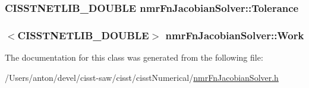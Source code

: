 \subsubsection[{Tolerance}]{\setlength{\rightskip}{0pt plus 5cm}C\+I\+S\+S\+T\+N\+E\+T\+L\+I\+B\+\_\+\+D\+O\+U\+B\+L\+E nmr\+Fn\+Jacobian\+Solver\+::\+Tolerance\hspace{0.3cm}{\ttfamily [protected]}}\label{classnmr_fn_jacobian_solver_a674186e39a43be30ebf759fc267feb64}
\hypertarget{classnmr_fn_jacobian_solver_aa3feee6872edf26213e56a7309aaa2bf}{}
\subsubsection[{Work}]{$<$C\+I\+S\+S\+T\+N\+E\+T\+L\+I\+B\+\_\+\+D\+O\+U\+B\+L\+E$>$ nmr\+Fn\+Jacobian\+Solver\+::\+Work\hspace{0.3cm}{\ttfamily [protected]}}\label{classnmr_fn_jacobian_solver_aa3feee6872edf26213e56a7309aaa2bf}


The documentation for this class was generated from the following file\+:\begin{DoxyCompactItemize}
\item 
/\+Users/anton/devel/cisst-\/saw/cisst/cisst\+Numerical/\hyperlink{nmr_fn_jacobian_solver_8h}{nmr\+Fn\+Jacobian\+Solver.\+h}\end{DoxyCompactItemize}
